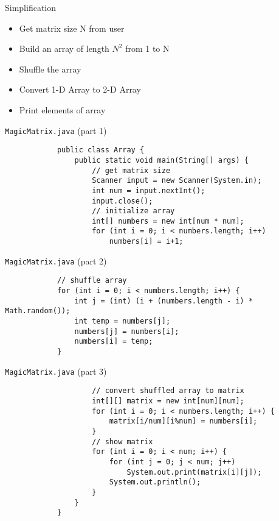 \documentclass[10pt, compress]{beamer}
\begin{document}
\begin{slide}
	\begin{block}{Simplification}
		\begin{itemize}
			\item[] Get matrix size N from user
			\item[] Build an array of length $N^2$ from 1 to N
			\item[] Shuffle the array
			\item[] Convert 1-D Array to 2-D Array
			\item[] Print elements of array
		\end{itemize}
	\end{block}
\end{slide}

\begin{slide}
	\begin{block}{\texttt{MagicMatrix.java} (part 1)}
		\begin{verbatim}
			public class Array {
			    public static void main(String[] args) {
			        // get matrix size
			        Scanner input = new Scanner(System.in);
			        int num = input.nextInt();
			        input.close();
			        // initialize array
			        int[] numbers = new int[num * num];
			        for (int i = 0; i < numbers.length; i++)
			            numbers[i] = i+1;
		\end{verbatim}
	\end{block}
\end{slide}

\begin{slide}
	\begin{block}{\texttt{MagicMatrix.java} (part 2)}
		\begin{verbatim}
			// shuffle array
			for (int i = 0; i < numbers.length; i++) {
			    int j = (int) (i + (numbers.length - i) * Math.random());
			    int temp = numbers[j];
			    numbers[j] = numbers[i];
			    numbers[i] = temp;
			}
		\end{verbatim}
	\end{block}
\end{slide}

\begin{slide}
	\begin{block}{\texttt{MagicMatrix.java} (part 3)}
		\begin{verbatim}
			        // convert shuffled array to matrix
			        int[][] matrix = new int[num][num];
			        for (int i = 0; i < numbers.length; i++) {
			            matrix[i/num][i%num] = numbers[i];
			        }
			        // show matrix
			        for (int i = 0; i < num; i++) {
			            for (int j = 0; j < num; j++)
			                System.out.print(matrix[i][j]);
			            System.out.println();
			        }
			    }
			}
		\end{verbatim}
	\end{block}
\end{slide}
\end{document}
